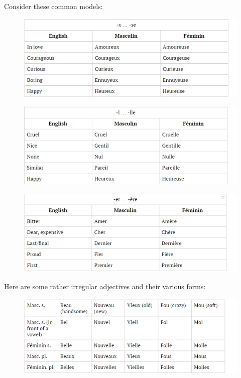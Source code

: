 \documentclass[11pt, oneside]{book}
\begin{document}
{{Consider these common models:  \vspace{0.5\baselineskip}

\begin{figure}[H]
	\includegraphics[scale=0.6]{charts/adjective1.png}
\end{figure} \vspace{0.5\baselineskip}

\begin{figure}[H]
	\includegraphics[scale=0.6]{charts/adjective2.png}
\end{figure} \vspace{0.5\baselineskip}

\begin{figure}[H]
	\includegraphics[scale=0.6]{charts/adjective3.png}
\end{figure} \vspace{0.5\baselineskip}

Here are some rather irregular adjectives and their various forms: 

\begin{figure}[H]
	\includegraphics[scale=0.6]{charts/adjectiveIrregulars.png}
\end{figure} \vspace{0.5\baselineskip}

}}
\end{document}
